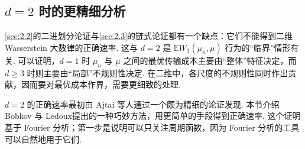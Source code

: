 \subsection{\texorpdfstring{$d=2$}{d=2} 时的更精细分析}\label{sec:2.4}
\autoref{sec:2.2}的二进划分论证与\autoref{sec:2.3}的链式论证都有一个缺点：它们不能得到二维 Wasserstein 大数律的正确速率. 这与 $d=2$ 是 $\mathbb EW_1(\mu_n,\mu)$ 行为的“临界”情形有关. 可以证明，$d=1$ 时 $\mu_n$ 与 $\mu$ 之间的最优传输成本主要由“整体”特征决定，而 $d\ge3$ 时则主要由“局部”不规则性决定. 在二维中，各尺度的不规则性同时作出贡献，因而要对最优成本作界，需要更细致的处理.

$d=2$ 的正确速率最初由 Ajtai 等人\cite{ref5}通过一个颇为精细的论证发现. 本节介绍 Bobkov 与 Ledoux\cite{ref42}提出的一种巧妙方法，用更简单的手段得到正确速率. 这个证明基于 Fourier 分析；第一步是说明可以只关注周期函数，因为 Fourier 分析的工具可以自然地用于它们.


